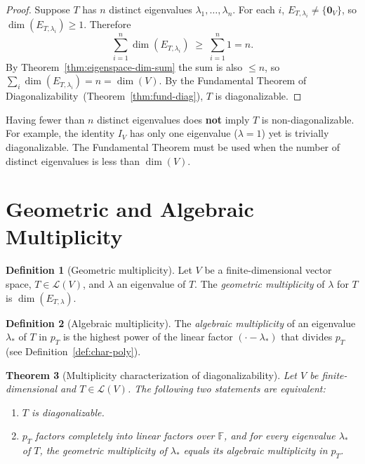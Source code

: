 \documentclass[11pt, a4paper, notitlepage]{report}
\newtheorem{theorem}{Theorem}[section]
\theoremstyle{definition}
\newtheorem{definition}[theorem]{Definition}
\theoremstyle{remark}
\begin{document}
\begin{proof}
Suppose $T$ has $n$ distinct eigenvalues $\lambda_1, \ldots, \lambda_n$. For each $i$,
$E_{T,\lambda_i} \neq \{\mathbf{0}_V\}$, so $\dim(E_{T,\lambda_i}) \geq 1$. Therefore
\[
  \sum_{i=1}^n \dim(E_{T,\lambda_i}) \;\geq\; \sum_{i=1}^n 1 = n.
\]
By Theorem~\ref{thm:eigenspace-dim-sum} the sum is also $\leq n$, so
$\sum_i \dim(E_{T,\lambda_i}) = n = \dim(V)$.
By the Fundamental Theorem of Diagonalizability~(Theorem~\ref{thm:fund-diag}), $T$ is
diagonalizable.
\end{proof}

\begin{warning}[title={Warning: Converse is False}]
Having fewer than $n$ distinct eigenvalues does \textbf{not} imply $T$ is non-diagonalizable.
For example, the identity $I_V$ has only one eigenvalue ($\lambda = 1$) yet is trivially
diagonalizable. The Fundamental Theorem must be used when the number of distinct eigenvalues
is less than $\dim(V)$.
\end{warning}

\section{Geometric and Algebraic Multiplicity}
\label{sec:multiplicity}

\begin{definition}[Geometric multiplicity]
\label{def:geom-multiplicity}
Let $V$ be a finite-dimensional vector space, $T \in \mathcal{L}(V)$, and $\lambda$ an
eigenvalue of $T$. The \emph{geometric multiplicity} of $\lambda$ for $T$ is $\dim(E_{T,\lambda})$.
\end{definition}

\begin{definition}[Algebraic multiplicity]
\label{def:alg-multiplicity}
The \emph{algebraic multiplicity} of an eigenvalue $\lambda_*$ of $T$ in $p_T$ is the highest
power of the linear factor $(\cdot - \lambda_*)$ that divides $p_T$
(see Definition~\ref{def:char-poly}).
\end{definition}

\begin{theorem}[Multiplicity characterization of diagonalizability]
\label{thm:multiplicity-diag}
Let $V$ be finite-dimensional and $T \in \mathcal{L}(V)$.
The following two statements are equivalent:
\begin{enumerate}
  \item $T$ is diagonalizable.
  \item $p_T$ factors completely into linear factors over $\mathbb{F}$, and for every eigenvalue
        $\lambda_*$ of $T$, the geometric multiplicity of $\lambda_*$ equals its algebraic
        multiplicity in $p_T$.
\end{enumerate}
\end{theorem}
\end{document}
